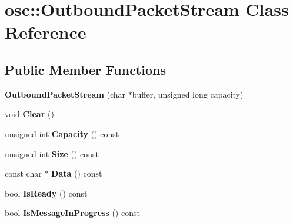 \hypertarget{classosc_1_1_outbound_packet_stream}{}\section{osc\+:\+:Outbound\+Packet\+Stream Class Reference}
\label{classosc_1_1_outbound_packet_stream}
\subsection*{Public Member Functions}
\begin{DoxyCompactItemize}
\item 
\mbox{\label{classosc_1_1_outbound_packet_stream_a498469840e2525400417630ab5b743b4}} 
{\bfseries Outbound\+Packet\+Stream} (char $\ast$buffer, unsigned long capacity)
\item 
\mbox{\label{classosc_1_1_outbound_packet_stream_a8564dda9feca993620970a8ad2272ef5}} 
void {\bfseries Clear} ()
\item 
\mbox{\label{classosc_1_1_outbound_packet_stream_a906ec2f83c497e07899591fe93964950}} 
unsigned int {\bfseries Capacity} () const
\item 
\mbox{\label{classosc_1_1_outbound_packet_stream_a9094a24a45ac7c75e4d0752fa6f91f60}} 
unsigned int {\bfseries Size} () const
\item 
\mbox{\label{classosc_1_1_outbound_packet_stream_a05f577be8faa8676521dcce67a567078}} 
const char $\ast$ {\bfseries Data} () const
\item 
\mbox{\label{classosc_1_1_outbound_packet_stream_a8c6635b9585a827d7f3b7fde13d00690}} 
bool {\bfseries Is\+Ready} () const
\item 
\mbox{\label{classosc_1_1_outbound_packet_stream_a8482902f790a1571480a0bedf66bbc2c}} 
bool {\bfseries Is\+Message\+In\+Progress} () const
\item 
\mbox{\label{classosc_1_1_outbound_packet_stream_a02c405572fa61e0b82c021e4125be902}} 

\end{DoxyCompactItemize}
